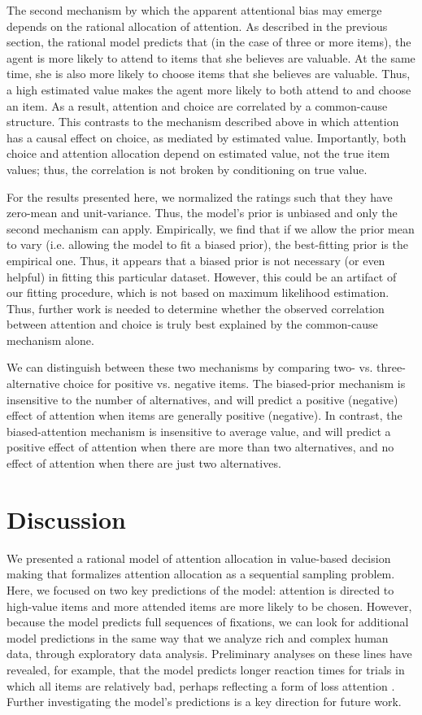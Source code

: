 \documentclass[12pt,a4paperpaper,]{article}
\begin{document}
The second mechanism by which the apparent attentional bias may emerge depends on the rational allocation of attention. As described in the previous section, the rational model predicts that (in the case of three or more items), the agent is more likely to attend to items that she believes are valuable. At the same time, she is also more likely to choose items that she believes are valuable. Thus, a high estimated value makes the agent more likely to both attend to and choose an item. As a result, attention and choice are correlated by a common-cause structure. This contrasts to the mechanism described above in which attention has a causal effect on choice, as mediated by estimated value. Importantly, both choice and attention allocation depend on estimated value, not the true item values; thus, the correlation is not broken by conditioning on true value.

For the results presented here, we normalized the ratings such that they have zero-mean and unit-variance. Thus, the model's prior is unbiased and only the second mechanism can apply. Empirically, we find that if we allow the prior mean to vary (i.e. allowing the model to fit a biased prior), the best-fitting prior is the empirical one. Thus, it appears that a biased prior is not necessary (or even helpful) in fitting this particular dataset. However, this could be an artifact of our fitting procedure, which is not based on maximum likelihood estimation. Thus, further work is needed to determine whether the observed correlation between attention and choice is truly best explained by the common-cause mechanism alone.

We can distinguish between these two mechanisms by comparing two- vs. three-alternative choice for positive vs. negative items. The biased-prior mechanism is insensitive to the number of alternatives, and will predict a positive (negative) effect of attention when items are generally positive (negative). In contrast, the biased-attention mechanism is insensitive to average value, and will predict a positive effect of attention when there are more than two alternatives, and no effect of attention when there are just two alternatives.


\section{Discussion}
We presented a rational model of attention allocation in value-based decision making that formalizes attention allocation as a sequential sampling problem. Here, we focused on two key predictions of the model: attention is directed to high-value items and more attended items are more likely to be chosen. However, because the model predicts full sequences of fixations, we can look for additional model predictions in the same way that we analyze rich and complex human data, through exploratory data analysis. Preliminary analyses on these lines have revealed, for example, that the model predicts longer reaction times for trials in which all items are relatively bad, perhaps reflecting a form of loss attention \citep{yechiam2013losses}. Further investigating the model's predictions is a key direction for future work.
\end{document}

